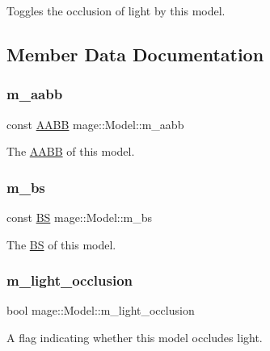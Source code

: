 Toggles the occlusion of light by this model. 

\subsection{Member Data Documentation}
\hypertarget{classmage_1_1_model_ab53a0f253df545fd59723bee107bf523}{}\label{classmage_1_1_model_ab53a0f253df545fd59723bee107bf523} 
\subsubsection{\texorpdfstring{m\+\_\+aabb}{m\_aabb}}
{\footnotesize\ttfamily const \hyperlink{structmage_1_1_a_a_b_b}{A\+A\+BB} mage\+::\+Model\+::m\+\_\+aabb\hspace{0.3cm}{\ttfamily [private]}}

The \hyperlink{structmage_1_1_a_a_b_b}{A\+A\+BB} of this model. \hypertarget{classmage_1_1_model_a1d3ea0a9f302f623dcaceb2df4315a0b}{}\label{classmage_1_1_model_a1d3ea0a9f302f623dcaceb2df4315a0b} 
\subsubsection{\texorpdfstring{m\+\_\+bs}{m\_bs}}
{\footnotesize\ttfamily const \hyperlink{structmage_1_1_b_s}{BS} mage\+::\+Model\+::m\+\_\+bs\hspace{0.3cm}{\ttfamily [private]}}

The \hyperlink{structmage_1_1_b_s}{BS} of this model. \hypertarget{classmage_1_1_model_af6e1183a2f2147b7848aa10010bdfcd3}{}\label{classmage_1_1_model_af6e1183a2f2147b7848aa10010bdfcd3} 
\subsubsection{\texorpdfstring{m\+\_\+light\+\_\+occlusion}{m\_light\_occlusion}}
{\footnotesize\ttfamily bool mage\+::\+Model\+::m\+\_\+light\+\_\+occlusion\hspace{0.3cm}{\ttfamily [private]}}

A flag indicating whether this model occludes light. \hypertarget{classmage_1_1_model_a88d97cd87b7ef37130f7a4007477698a}{}\label{classmage_1_1_model_a88d97cd87b7ef37130f7a4007477698a} 
